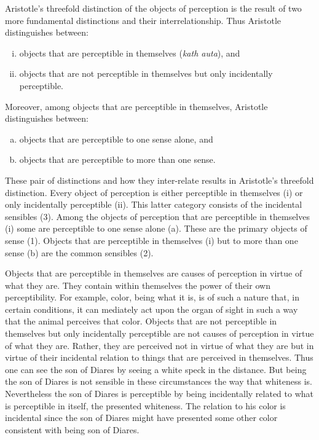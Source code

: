 Aristotle's threefold distinction of the objects of perception is the result of two more fundamental distinctions and their interrelationship. Thus Aristotle distinguishes between:
\begin{enumerate}[(i)]
	\item objects that are perceptible in themselves (\emph{kath auta}), and
	\item objects that are not perceptible in themselves but only incidentally perceptible.
\end{enumerate}
Moreover, among objects that are perceptible in themselves, Aristotle distinguishes between:
\begin{enumerate}[(a)]
	\item objects that are perceptible to one sense alone, and
	\item objects that are perceptible to more than one sense.
\end{enumerate}
These pair of distinctions and how they inter-relate results in Aristotle's threefold distinction. Every object of perception is either perceptible in themselves (i) or only incidentally perceptible (ii). This latter category consists of the incidental sensibles (3). Among the objects of perception that are perceptible in themselves (i) some are perceptible to one sense alone (a). These are the primary objects of sense (1). Objects that are perceptible in themselves (i) but to more than one sense (b) are the common sensibles (2).

Objects that are perceptible in themselves are causes of perception in virtue of what they are. They contain within themselves the power of their own perceptibility. For example, color, being what it is, is of such a nature that, in certain conditions, it can mediately act upon the organ of sight in such a way that the animal perceives that color. Objects that are not perceptible in themselves but only incidentally perceptible are not causes of perception in virtue of what they are. Rather, they are perceived not in virtue of what they are but in virtue of their incidental relation to things that are perceived in themselves. Thus one can see the son of Diares by seeing a white speck in the distance. But being the son of Diares is not sensible in these circumstances the way that whiteness is. Nevertheless the son of Diares is perceptible by being incidentally related to what is perceptible in itself, the presented whiteness. The relation to his color is incidental since the son of Diares might have presented some other color consistent with being son of Diares.


